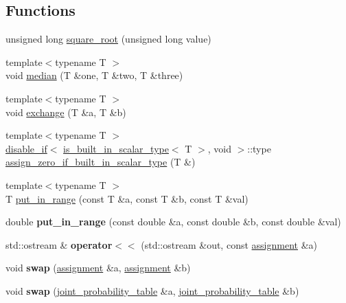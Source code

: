 \subsection*{Functions}
\begin{DoxyCompactItemize}
\item 
unsigned long \hyperlink{namespacedlib_aa718d15067f15dd851a98eb1088131ae}{square\_\-root} (unsigned long value)
\item 
{\footnotesize template$<$typename T $>$ }\\void \hyperlink{namespacedlib_af2608709700ae61f169fd4687e406267}{median} (T \&one, T \&two, T \&three)
\item 
{\footnotesize template$<$typename T $>$ }\\void \hyperlink{namespacedlib_a7a50a190179be95c0d38aaa92960d1dc}{exchange} (T \&a, T \&b)
\item 
{\footnotesize template$<$typename T $>$ }\\\hyperlink{structboost_1_1disable__if}{disable\_\-if}$<$ \hyperlink{structdlib_1_1is__built__in__scalar__type}{is\_\-built\_\-in\_\-scalar\_\-type}$<$ T $>$, void $>$::type \hyperlink{namespacedlib_ab31aceb3894feb837313ad0add9d9294}{assign\_\-zero\_\-if\_\-built\_\-in\_\-scalar\_\-type} (T \&)
\item 
{\footnotesize template$<$typename T $>$ }\\T \hyperlink{namespacedlib_a36bcf970b14e81d1c300283a52d64142}{put\_\-in\_\-range} (const T \&a, const T \&b, const T \&val)
\item 
\hypertarget{namespacedlib_a34199fb0e81115d1a7eec041d0f2edef}{
double {\bfseries put\_\-in\_\-range} (const double \&a, const double \&b, const double \&val)}
\label{namespacedlib_a34199fb0e81115d1a7eec041d0f2edef}

\item 
\hypertarget{namespacedlib_a664fced8a504dcda3711a21258481150}{
std::ostream \& {\bfseries operator$<$$<$} (std::ostream \&out, const \hyperlink{classdlib_1_1assignment}{assignment} \&a)}
\label{namespacedlib_a664fced8a504dcda3711a21258481150}

\item 
\hypertarget{namespacedlib_a7afaf7852d23c95c6145909611737d13}{
void {\bfseries swap} (\hyperlink{classdlib_1_1assignment}{assignment} \&a, \hyperlink{classdlib_1_1assignment}{assignment} \&b)}
\label{namespacedlib_a7afaf7852d23c95c6145909611737d13}

\item 
\hypertarget{namespacedlib_af347d1e8f9880bb7f1f1c3a42ea60df3}{
void {\bfseries swap} (\hyperlink{classdlib_1_1joint__probability__table}{joint\_\-probability\_\-table} \&a, \hyperlink{classdlib_1_1joint__probability__table}{joint\_\-probability\_\-table} \&b)}
\label{namespacedlib_af347d1e8f9880bb7f1f1c3a42ea60df3}


\end{DoxyCompactItemize}
